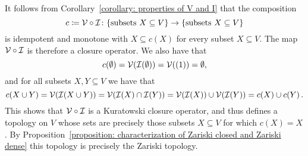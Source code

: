 \begin{remark}
  It follows from Corollary~\ref{corollary: properties of V and I} that the composition
  \[
              c
    \coloneqq  \mathcal{V} \circ \mathcal{I}
    \colon    \{ \text{subsets $X \subseteq V$} \}
    \to       \{ \text{subsets $X \subseteq V$} \}
  \]
  is idempotent and monotone with $X \subseteq c(X)$ for every subset $X \subseteq V$.
  The map $\mathcal{V} \circ \mathcal{I}$ is therefore a closure operator.
  We also have that
  \[
      c(\emptyset)
    = \mathcal{V}(\mathcal{I}(\emptyset))
    = \mathcal{V}((1))
    = \emptyset,
  \]
  and for all subsets $X, Y \subseteq V$ we have that
  \[
      c(X \cup Y)
    = \mathcal{V}(\mathcal{I}(X \cup Y))
    = \mathcal{V}(\mathcal{I}(X) \cap \mathcal{I}(Y))
    = \mathcal{V}(\mathcal{I}(X)) \cup \mathcal{V}(\mathcal{I}(Y))
    = c(X) \cup c(Y) \,.
  \]
  This shows that $\mathcal{V} \circ \mathcal{I}$ is a Kuratowski closure operator, and thus defines a topology on $V$ whose sets are precisely those subsets $X \subseteq V$ for which $c(X) = X$.
  By Proposition~\ref{proposition: characterization of Zariski closed and Zariski dense} this topology is precisely the Zariski topology.
\end{remark}







